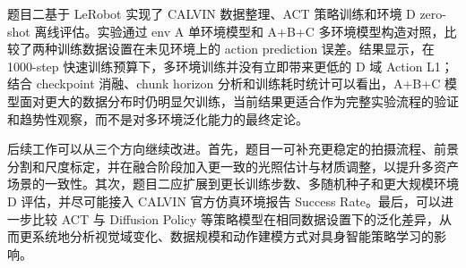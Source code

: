 \documentclass[12pt,a4paper]{ctexart}
\begin{document}
题目二基于 LeRobot 实现了 CALVIN 数据整理、ACT 策略训练和环境 D zero-shot 离线评估。实验通过 env A 单环境模型和 A+B+C 多环境模型构造对照，比较了两种训练数据设置在未见环境上的 action prediction 误差。结果显示，在 1000-step 快速训练预算下，多环境训练并没有立即带来更低的 D 域 Action L1；结合 checkpoint 消融、chunk horizon 分析和训练耗时统计可以看出，A+B+C 模型面对更大的数据分布时仍明显欠训练，当前结果更适合作为完整实验流程的验证和趋势性观察，而不是对多环境泛化能力的最终定论。

后续工作可以从三个方向继续改进。首先，题目一可补充更稳定的拍摄流程、前景分割和尺度标定，并在融合阶段加入更一致的光照估计与材质调整，以提升多资产场景的一致性。其次，题目二应扩展到更长训练步数、多随机种子和更大规模环境 D 评估，并尽可能接入 CALVIN 官方仿真环境报告 Success Rate。最后，可以进一步比较 ACT 与 Diffusion Policy 等策略模型在相同数据设置下的泛化差异，从而更系统地分析视觉域变化、数据规模和动作建模方式对具身智能策略学习的影响。
\end{document}
